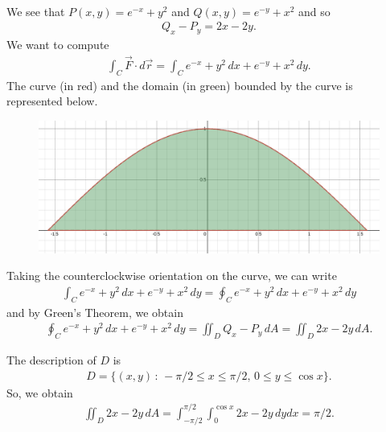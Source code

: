 	\\
	We see that $P(x, y) = e^{-x} + y^2$ and $Q(x, y) = e^{-y} + x^2$ and so 
		\begin{align*}
		Q_x - P_y = 2x - 2y .
		\end{align*}
	We want to compute
		\begin{align*}
		\int_C \vec{F} \cdot d \vec{r} = \int_C e^{-x} + y^2 \, dx + e^{-y} + x^2 \, dy .
		\end{align*}
	The curve (in red) and the domain (in green) bounded by the curve is represented below.
		\begin{figure}[ht]
		\centering
		\includegraphics[scale=0.3]{picture1.png}
		\end{figure}
	Taking the counterclockwise orientation on the curve, we can write
		\begin{align*}
		\int_C e^{-x} + y^2 \, dx + e^{-y} + x^2 \, dy = \oint_C e^{-x} + y^2 \, dx + e^{-y} + x^2 \, dy 
		\end{align*}
	and by Green's Theorem, we obtain
		\begin{align*}
		\oint_C e^{-x} + y^2 \, dx + e^{-y} + x^2 \, dy = \iint_D Q_x - P_y \, dA = \iint_D 2x - 2y \, dA .
		\end{align*}
	
	The description of $D$ is
		\begin{align*}
		D = \{ (x, y ) \, : \, -\pi/2 \leq x \leq \pi/2 , \, 0 \leq y \leq \cos x \} .
		\end{align*}
	So, we obtain
		\begin{align*}
		\iint_D 2x - 2y \, dA = \int_{-\pi/2}^{\pi/2} \int_0^{\cos x} 2x - 2y \, dy dx = \pi/2 .
		\end{align*}
		
	\spc
	

